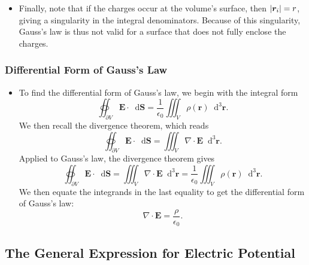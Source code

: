 \documentclass[11pt, a4paper]{article}
\newcommand{\diff}{\mathop{}\!\mathrm{d}} %
\newcommand{\dr}{\diff^{3} \r}  %
\renewcommand{\vec}[1]{\bm{#1}} %
\renewcommand{\r}{\vec{r}}
\newcommand{\E}{\vec{E}} %
\newcommand{\ee}{\epsilon_{0}}  %
\renewcommand{\div}{\nabla \cdot}
\begin{document}
\begin{itemize}
	\item Finally, note that if the charges occur at the volume's surface, then $ \abs{\r_{i}} = r $, giving a singularity in the integral denominators. Because of this singularity, Gauss's law is thus not valid for a surface that does not fully enclose the charges.
\end{itemize}

\subsubsection{Differential Form of Gauss's Law}
\begin{itemize}
	\item To find the differential form of Gauss's law, we begin with the integral form
	\begin{equation*}
		\oiint_{\partial V} \E \cdot \diff \vec{S} = \frac{1}{\ee}\iiint_{V}\rho(\r) \dr.
	\end{equation*}
	We then recall the divergence theorem, which reads
	\begin{equation*}
		\oiint_{\partial V} \E \cdot \diff \vec{S} = \iiint_{V}\div \E \dr.
	\end{equation*}
	Applied to Gauss's law, the divergence theorem gives
	\begin{equation*}
		\oiint_{\partial V} \E \cdot \diff \vec{S} = \iiint_{V}\div \E \dr = \frac{1}{\ee} \iiint_{V} \rho(\r) \dr.
	\end{equation*}
	We then equate the integrands in the last equality to get the differential form of Gauss's law:
	\begin{equation*}
		\div \E = \frac{\rho}{\ee}.
	\end{equation*}
\end{itemize}

\subsection{The General Expression for Electric Potential}
\end{document}
